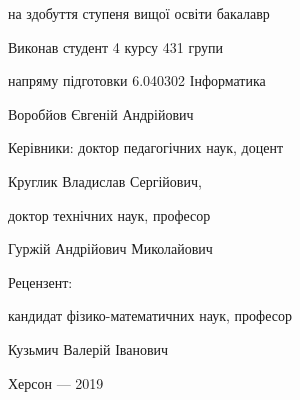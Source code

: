 \thispagestyle{empty}

{

на здобуття ступеня вищої освіти бакалавр

}

\vfill

\hfill\begin{minipage}[t]{0.65\textwidth}
Виконав студент 4 курсу 431 групи 

напряму підготовки 6.040302 Інформатика

Воробйов Євгеній Андрійович

Керівники: доктор педагогічних наук, доцент

Круглик Владислав Сергійович,

доктор технічних наук, професор

Гуржій Андрійович Миколайович

Рецензент: 

кандидат фізико-математичних наук, професор

Кузьмич Валерій Іванович


\end{minipage}

\vfill

{\centering
Херсон --- 2019

}